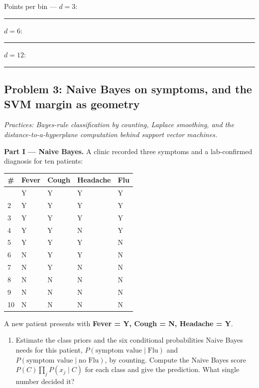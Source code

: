 \documentclass[
  11pt,
]{article}
\newcounter{none} %
\providecommand{\tightlist}{%
  \setlength{\itemsep}{0pt}\setlength{\parskip}{0pt}}
\newcommand{\answerspace}[1]{\par\vspace*{#1}}  %
\newcommand{\blank}[1][1.2in]{\rule{#1}{0.4pt}}
\newcommand{\answerpage}{\clearpage}
\begin{document}
Points per bin --- \(d = 3\): \blank[0.8in]\quad \(d = 6\):
\blank[0.8in]\quad \(d = 12\): \blank[0.8in]

\answerspace{1.8in}

\answerpage

\subsection{Problem 3: Naive Bayes on symptoms, and the SVM margin as
geometry}\label{problem-3-naive-bayes-on-symptoms-and-the-svm-margin-as-geometry}

\emph{Practices: Bayes-rule classification by counting, Laplace
smoothing, and the distance-to-a-hyperplane computation behind support
vector machines.}

\textbf{Part I --- Naive Bayes.} A clinic recorded three symptoms and a
lab-confirmed diagnosis for ten patients:

{\def\LTcaptype{none} %
\begin{longtable}[]{@{}lllll@{}}
\toprule\noalign{}
\# & Fever & Cough & Headache & Flu \\
\midrule\noalign{}
\endhead
\bottomrule\noalign{}
\endlastfoot
1 & Y & Y & Y & Y \\
2 & Y & Y & Y & Y \\
3 & Y & Y & Y & Y \\
4 & Y & Y & N & Y \\
5 & Y & Y & Y & N \\
6 & N & Y & Y & N \\
7 & N & Y & N & N \\
8 & N & N & N & N \\
9 & N & N & N & N \\
10 & N & N & N & N \\
\end{longtable}
}

A new patient presents with \textbf{Fever = Y, Cough = N, Headache = Y}.

\begin{enumerate}
\def\labelenumi{(\alph{enumi})}
\tightlist
\item
  Estimate the class priors and the six conditional probabilities Naive
  Bayes needs for this patient,
  \(P(\text{symptom value} \mid \text{Flu})\) and
  \(P(\text{symptom value} \mid \text{no Flu})\), by counting. Compute
  the Naive Bayes score \(P(C)\prod_j P(x_j \mid C)\) for each class and
  give the prediction. What single number decided it?
\end{enumerate}
\end{document}
